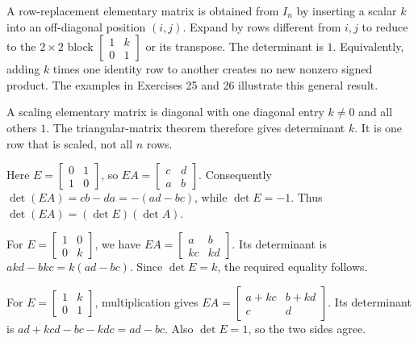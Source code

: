 A row-replacement elementary matrix is obtained from $I_n$ by inserting a scalar $k$ into an off-diagonal position $(i,j)$. Expand by rows different from $i,j$ to reduce to the $2\times2$ block $\left[\begin{smallmatrix}1&k\\0&1\end{smallmatrix}\right]$ or its transpose. The determinant is $1$. Equivalently, adding $k$ times one identity row to another creates no new nonzero signed product. The examples in Exercises 25 and 26 illustrate this general result.

A scaling elementary matrix is diagonal with one diagonal entry $k\ne0$ and all others $1$. The triangular-matrix theorem therefore gives determinant $k$. It is one row that is scaled, not all $n$ rows.

Here $E=\left[\begin{smallmatrix}0&1\\1&0\end{smallmatrix}\right]$, so $EA=\left[\begin{smallmatrix}c&d\\a&b\end{smallmatrix}\right]$. Consequently $\det(EA)=cb-da=-(ad-bc)$, while $\det E=-1$. Thus $\det(EA)=(\det E)(\det A)$.

For $E=\left[\begin{smallmatrix}1&0\\0&k\end{smallmatrix}\right]$, we have $EA=\left[\begin{smallmatrix}a&b\\kc&kd\end{smallmatrix}\right]$. Its determinant is $akd-bkc=k(ad-bc)$. Since $\det E=k$, the required equality follows.

For $E=\left[\begin{smallmatrix}1&k\\0&1\end{smallmatrix}\right]$, multiplication gives $EA=\left[\begin{smallmatrix}a+kc&b+kd\\c&d\end{smallmatrix}\right]$. Its determinant is $ad+kcd-bc-kdc=ad-bc$. Also $\det E=1$, so the two sides agree.

